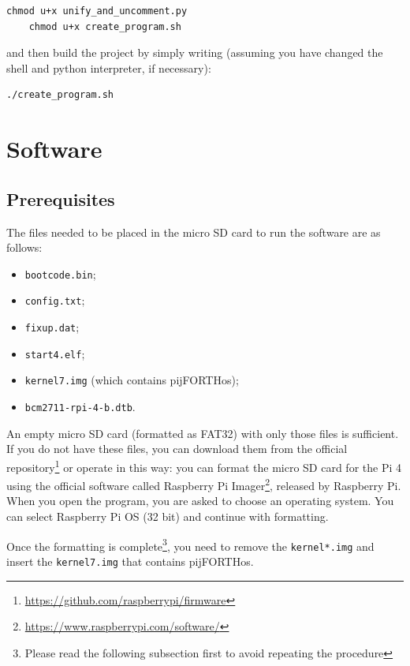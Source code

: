 \documentclass[a4paper, 12pt]{article}
\begin{document}
\begin{Verbatim}[breaklines=true, breakanywhere=true]
    chmod u+x unify_and_uncomment.py
    chmod u+x create_program.sh
\end{Verbatim}

and then build the project by simply writing (assuming you have changed the shell and python interpreter, if necessary):

\begin{Verbatim}[breaklines=true, breakanywhere=true]
    ./create_program.sh
\end{Verbatim}
\section{Software}

\subsection{Prerequisites}

The files needed to be placed in the micro SD card to run the software are as follows:
\begin{itemize}
    \item \texttt{bootcode.bin};
    \item \texttt{config.txt};
    \item \texttt{fixup.dat};
    \item \texttt{start4.elf};
    \item \texttt{kernel7.img} (which contains pijFORTHos);
    \item \texttt{bcm2711-rpi-4-b.dtb}.
\end{itemize}

An empty micro SD card (formatted as FAT32) with only those files is sufficient. \\ 
If you do not have these files, you can download them from the official repository\footnote{\url{https://github.com/raspberrypi/firmware}} or operate in this way: you can format the micro SD card for the Pi 4 using the official software called Raspberry Pi Imager\footnote{\url{https://www.raspberrypi.com/software/}}, released by Raspberry Pi. \\
When you open the program, you are asked to choose an operating system. You can select Raspberry Pi OS (32 bit) and continue with formatting.

Once the formatting is complete\footnote{Please read the following subsection first to avoid repeating the procedure}, you need to remove the \texttt{kernel*.img} and insert the \texttt{kernel7.img} that contains pijFORTHos.
\end{document}
